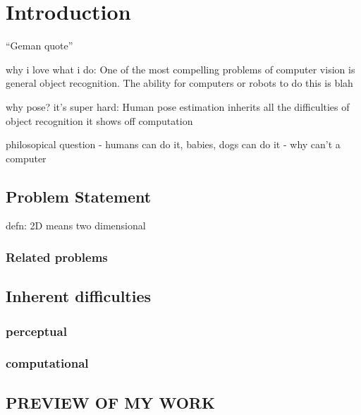 \chapter{Introduction}

``Geman quote''

why i love what i do:
One of the most compelling problems of computer vision is general object 
recognition.  The ability for computers or robots to do this is blah

why pose?
it's super hard: Human pose estimation inherits all the difficulties of object 
recognition
it shows off computation

philosopical question - humans can do it, babies,  dogs can do it - why can't a 
computer

\section{Problem Statement}

defn: 2D means two dimensional
\subsection{Related problems}

\section{Inherent difficulties}
\subsection{perceptual}
\subsection{computational}

\section{PREVIEW OF MY WORK}


